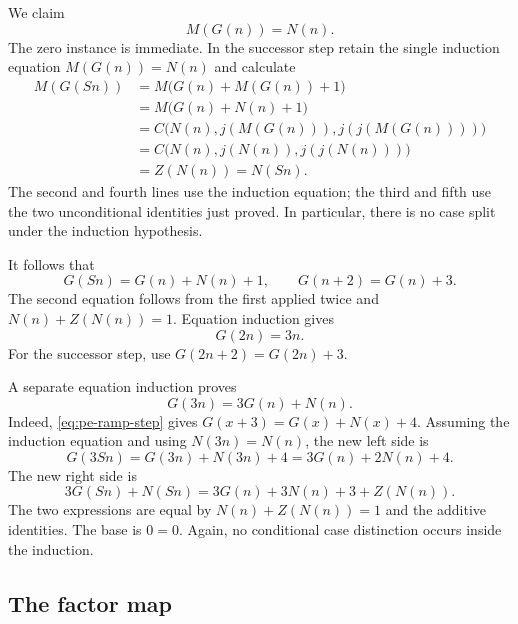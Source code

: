 We claim
\begin{equation}
 M(G(n))=N(n).\label{eq:pe-ramp-invariant}
\end{equation}
The zero instance is immediate.  In the successor step retain the single
induction equation $M(G(n))=N(n)$ and calculate
\begin{align*}
 M(G(Sn))
 &=M\bigl(G(n)+M(G(n))+1\bigr)\\
 &=M\bigl(G(n)+N(n)+1\bigr)\\
 &=C\bigl(N(n),j(M(G(n))),j(j(M(G(n))))\bigr)\\
 &=C\bigl(N(n),j(N(n)),j(j(N(n)))\bigr)\\
 &=Z(N(n))=N(Sn).
\end{align*}
The second and fourth lines use the induction equation; the third and
fifth use the two unconditional identities just proved.  In particular,
there is no case split under the induction hypothesis.

It follows that
\begin{equation}
 G(Sn)=G(n)+N(n)+1,\qquad G(n+2)=G(n)+3.
 \label{eq:pe-ramp-step}
\end{equation}
The second equation follows from the first applied twice and
$N(n)+Z(N(n))=1$.  Equation induction gives
\begin{equation}
 G(2n)=3n.\label{eq:pe-ramp-double}
\end{equation}
For the successor step, use $G(2n+2)=G(2n)+3$.

A separate equation induction proves
\begin{equation}
 G(3n)=3G(n)+N(n).\label{eq:pe-ramp-triple}
\end{equation}
Indeed, \eqref{eq:pe-ramp-step} gives
$G(x+3)=G(x)+N(x)+4$.  Assuming the induction equation and using
$N(3n)=N(n)$, the new left side is
\[
 G(3Sn)=G(3n)+N(3n)+4=3G(n)+2N(n)+4.
\]
The new right side is
\[
 3G(Sn)+N(Sn)=3G(n)+3N(n)+3+Z(N(n)).
\]
The two expressions are equal by $N(n)+Z(N(n))=1$ and the additive
identities.  The base is $0=0$.  Again, no conditional case distinction
occurs inside the induction.

\subsection{The factor map}

